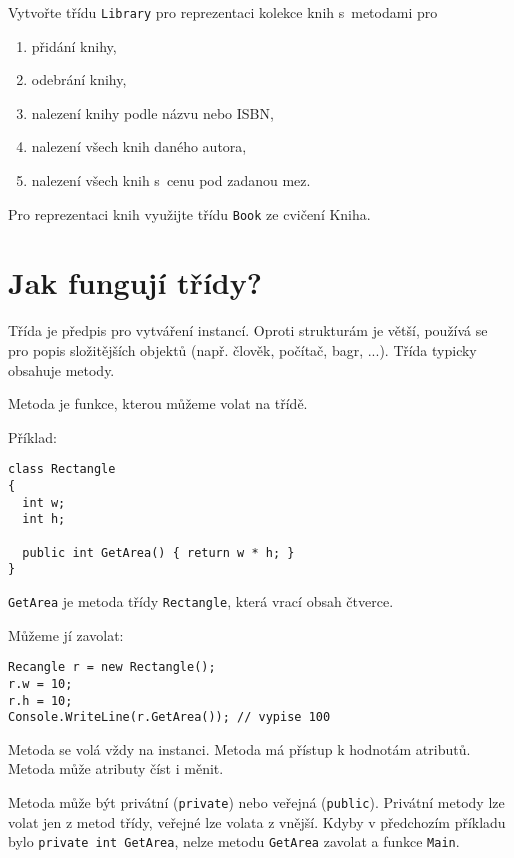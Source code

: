\documentclass[12pt,a4paper]{article}
\begin{document}
Vytvořte třídu \texttt{Library} pro reprezentaci kolekce knih s metodami pro
\begin{enumerate}
	\setlength\itemsep{0em}
	\setlength{\parskip}{0pt}
	\item přidání knihy,
	\item odebrání knihy,
	\item nalezení knihy podle názvu nebo ISBN,
	\item nalezení všech knih daného autora,
	\item nalezení všech knih s cenu pod zadanou mez.
\end{enumerate}

Pro reprezentaci knih využijte třídu \texttt{Book} ze cvičení Kniha.


\newpage

\section*{Jak fungují třídy?}

Třída je předpis pro vytváření instancí. Oproti strukturám je větší, používá
se pro popis složitějších objektů (např. člověk, počítač, bagr, ...). Třída
typicky obsahuje metody.

Metoda je funkce, kterou můžeme volat na třídě.

Příklad:

\begin{verbatim}
class Rectangle
{
  int w;
  int h;

  public int GetArea() { return w * h; }
}
\end{verbatim}

\texttt{GetArea} je metoda třídy \texttt{Rectangle}, která vrací obsah čtverce.

Můžeme jí zavolat:

\begin{verbatim}
Recangle r = new Rectangle();
r.w = 10;
r.h = 10;
Console.WriteLine(r.GetArea()); // vypise 100
\end{verbatim}

Metoda se volá vždy na instanci. Metoda má přístup k hodnotám atributů. Metoda
může atributy číst i měnit.

Metoda může být privátní (\texttt{private}) nebo veřejná (\texttt{public}).
Privátní metody lze volat jen z metod třídy, veřejné lze volata z vnější.
Kdyby v předchozím příkladu bylo \texttt{private int GetArea}, nelze metodu
\texttt{GetArea} zavolat a funkce \texttt{Main}.
\end{document}
